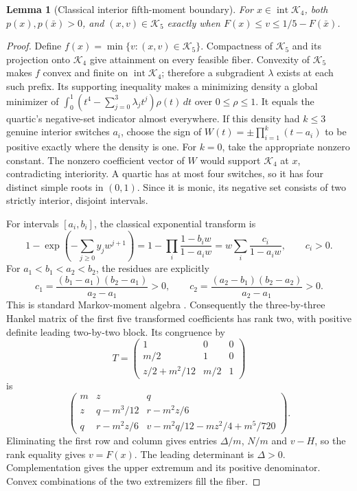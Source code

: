 \documentclass[pdflatex,sn-mathphys-num]{sn-jnl}
\theoremstyle{thmstyleone}
\newtheorem{lemma}[theorem]{Lemma}
\theoremstyle{thmstyletwo}\newtheorem{remark}[theorem]{Remark}
\newcommand{\K}{\mathcal K}
\begin{document}
\begin{lemma}[Classical interior fifth-moment boundary]\label{lem:five-boundary}
For $x\in\operatorname{int}\K_4$, both $p(x),p(\bar x)>0$, and
$(x,v)\in\K_5$ exactly when $F(x)\le v\le1/5-F(\bar x)$.
\end{lemma}
\begin{proof}
Define $f(x)=\min\{v:(x,v)\in\K_5\}$. Compactness of $\K_5$ and its
projection onto $\K_4$ give attainment on every feasible fiber. Convexity
of $\K_5$ makes $f$ convex and finite on $\operatorname{int}\K_4$;
therefore a subgradient $\lambda$ exists at each such prefix. Its supporting
inequality makes a minimizing density a global minimizer of
$\int_0^1(t^4-\sum_{j=0}^3\lambda_jt^j)\rho(t)\,dt$ over $0\le\rho\le1$.
It equals the quartic's negative-set indicator almost everywhere.
If this density had $k\le3$ genuine interior switches $a_i$, choose the
sign of $W(t)=\pm\prod_{i=1}^k(t-a_i)$ to be positive exactly where the
density is one. For $k=0$, take the appropriate nonzero constant.
The nonzero coefficient vector of $W$ would support $\K_4$ at $x$,
contradicting interiority. A quartic has at most four switches, so it has
four distinct simple roots in $(0,1)$. Since it is monic, its negative set
consists of two strictly interior, disjoint intervals.

For intervals $[a_i,b_i]$, the classical exponential transform is
\[
 1-\exp\left(-\sum_{j\ge0}y_jw^{j+1}\right)
 =1-\prod_i\frac{1-b_iw}{1-a_iw}
 =w\sum_i\frac{c_i}{1-a_iw},\qquad c_i>0.
\]
For $a_1<b_1<a_2<b_2$, the residues are explicitly
\[
 c_1=\frac{(b_1-a_1)(b_2-a_1)}{a_2-a_1}>0,\qquad
 c_2=\frac{(a_2-b_1)(b_2-a_2)}{a_2-a_1}>0.
\]
This is standard Markov-moment algebra \cite{gr}. Consequently the three-by-three Hankel
matrix of the first five transformed coefficients has rank two, with
positive definite leading two-by-two block. Its congruence by
\[
 T=\begin{pmatrix}1&0&0\\m/2&1&0\\z/2+m^2/12&m/2&1\end{pmatrix}
\]
is
\[
 \begin{pmatrix}
 m&z&q\\
 z&q-m^3/12&r-m^2z/6\\
 q&r-m^2z/6&v-m^2q/12-mz^2/4+m^5/720
 \end{pmatrix}.
\]
Eliminating the first row and column gives entries $\Delta/m$, $N/m$ and
$v-H$, so the rank equality gives $v=F(x)$. The leading determinant is
$\Delta>0$. Complementation gives the upper extremum and its positive
denominator. Convex combinations of the two extremizers fill the fiber.
\end{proof}
\end{document}
